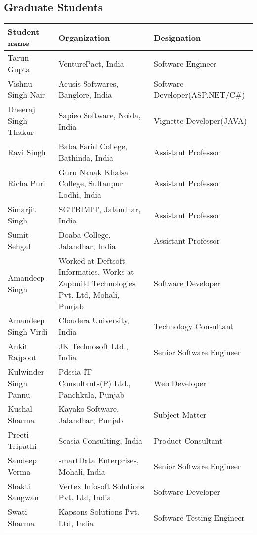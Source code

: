\documentclass[margin,line]{res}
\begin{document}
\begin{resume}
\newpage

\section{\sc Graduate Students}
\begin{center}
    \begin{tabular}{ | p{3.5cm} | p{5.70cm} | l | }
    \hline
    \textbf{Student name} & \textbf{Organization} & \textbf{Designation}\\
    \hline
    Tarun Gupta & VenturePact, India & Software Engineer\\
    \hline
    Vishnu Singh Nair & Acusis Softwares, Banglore, India & Software Developer(ASP.NET/C\#)\\
    \hline
    Dheeraj Singh Thakur & Sapieo Software, Noida, India & Vignette Developer(JAVA)\\
    \hline
    Ravi Singh & Baba Farid College, Bathinda, India & Assistant Professor\\
    \hline
    Richa Puri & Guru Nanak Khalsa College, Sultanpur Lodhi, India & Assistant Professor\\
    \hline
	Simarjit Singh & SGTBIMIT, Jalandhar, India & Assistant Professor\\
    \hline
    Sumit Sehgal & Doaba College, Jalandhar, India & Assistant Professor\\
    \hline
    Amandeep Singh & Worked at Deftsoft Informatics. Works at Zapbuild Technologies Pvt. Ltd, Mohali, Punjab & Software Developer\\
    \hline
    Amandeep Singh Virdi & Cloudera University, India & Technology Consultant\\
    \hline
    Ankit Rajpoot & JK Technosoft Ltd., India & Senior Software Engineer\\
    \hline
    Kulwinder Singh Pannu & Pdssia IT Consultants(P) Ltd., Panchkula, Punjab & Web Developer\\
    \hline
    Kushal Sharma & Kayako Software, Jalandhar, Punjab & Subject Matter\\
    \hline
    Preeti Tripathi & Seasia Consulting, India & Product Consultant\\
    \hline
    Sandeep Verma & smartData Enterprises, Mohali, India & Senior Software Engineer\\
    \hline
    Shakti Sangwan & Vertex Infosoft Solutions Pvt. Ltd, India & Software Developer\\
    \hline
	Swati Sharma & Kapsons Solutions Pvt. Ltd, India & Software Testing Engineer\\

\end{tabular}
\end{center}
\end{resume}
\end{document}
